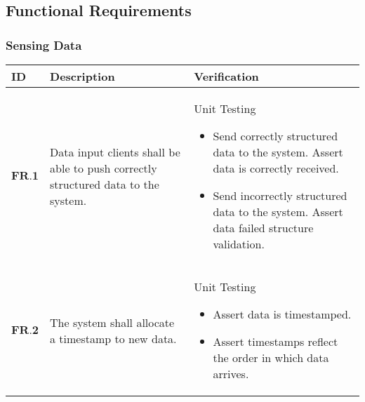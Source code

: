 \subsection{Functional Requirements}
\subsubsection{Sensing Data}
\begin{longtable}[H]{| p{1.5cm} | p{6cm} | p{9cm} | }
    	\hline
    	\cellcolor{titleColor}\textbf{ID}   & \cellcolor{titleColor}\textbf{Description}                                                              & \cellcolor{titleColor}\textbf{Verification}                                                                                                                                                                                                                                     \\ \hline
    	$\textbf{FR.1}$ & Data input clients shall be able to push correctly structured data to the system. & Unit Testing 
	\begin{itemize} 
	\item Send correctly structured data to the system. Assert data is correctly received.
	 \item Send incorrectly structured data to the system. Assert data failed structure validation.
	 \end{itemize} \\ \hline
    	$\textbf{FR.2}$ & The system shall allocate a timestamp to new data.                                & Unit Testing\begin{itemize} \item Assert data is timestamped.\item Assert timestamps reflect the order in which data arrives.\end{itemize}\\ \hline
\end{longtable}


